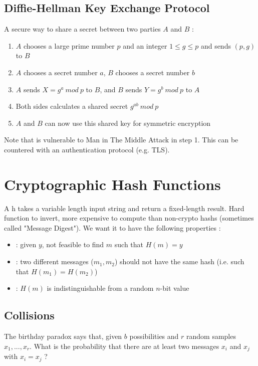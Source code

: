 \section{Diffie-Hellman Key Exchange Protocol}

A secure way to share a secret between two parties $A$ and $B$ :
\begin{enumerate}
    \item $A$ chooses a large prime number $p$ and an integer $1 \leq g \leq p$ and sends $(p, g)$ to $B$
    \item $A$ chooses a secret number $a$, $B$ chooses a secret number $b$
    \item $A$ sends $X = g^a\ mod\ p$ to $B$, and $B$ sends $Y = g^b\ mod\ p$ to $A$
    \item Both sides calculates a shared secret $g^{ab}\ mod\ p$
    \item $A$ and $B$ can now use this shared key for symmetric encryption
\end{enumerate}

Note that is vulnerable to Man in The Middle Attack in step 1. This can be countered with an authentication protocol (e.g. TLS).

\chapter{Cryptographic Hash Functions}

A h takes a variable length input string and return a fixed-length result. Hard function to invert, more expensive to compute than non-crypto hashs (sometimes called "Message Digest"). We want it to have the following properties :
\begin{itemize}
    \item {} : given $y$, not feasible to find $m$ such that $H(m) = y$
    \item {} : two different messages ($m_1, m_2$) should not have the same hash (i.e. such that $H(m_1) = H(m_2)$)
    \item {} : $H(m)$ is indistinguishable from a random $n$-bit value
\end{itemize}

\section{Collisions}

The birthday paradox says that, given $b$ possibilities and $r$ random samples $x_1, ..., x_r$. What is the probability that there are at least two messages $x_i$ and $x_j$ with $x_i = x_j$ ?

